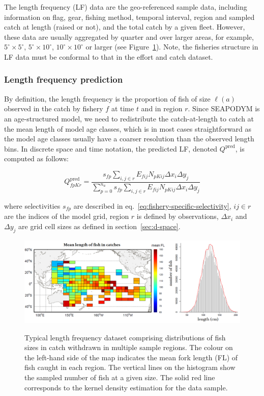 The length frequency (LF) data are the geo-referenced sample data, including information on flag, gear, fishing method, temporal interval, region and sampled catch at length (raised or not), and the total catch by a given fleet. However, these data are usually aggregated by quarter and over larger areas, for example, $5^{\circ} \times 5^{\circ}$, $5^{\circ} \times 10^{\circ}$, $10^{\circ} \times 10^{\circ}$ or larger (see Figure~\ref{fig:lf-data}). Note, the fisheries structure in LF data must be conformal to that in the effort and catch dataset. 

\subsubsection{Length frequency prediction}

By definition, the length frequency is the proportion of fish of size $\ell(a)$ observed in the catch by fishery $f$ at time $t$ and in region $r$. Since SEAPODYM is an age-structured model, we need to redistribute the catch-at-length to catch at the mean length of model age classes, which is in most cases straightforward as the model age classes usually have a coarser resolution than the observed length bins. In discrete space and time notation, the predicted LF, denoted $Q^{\text{pred}}$, is computed as follows:

\begin{equation}
 Q^{\text{pred}}_{fpKr}=\frac{s_{fp} \sum\limits_{i,j \in r} E_{fij} N_{pKij}{\scriptstyle\Delta x_i} {\scriptstyle\Delta y_j}}{\sum\limits^{n_a}_{p=0} s_{fp} \sum\limits_{i,j \in r} E_{fij} N_{pKij}{\scriptstyle\Delta x_i} {\scriptstyle\Delta} y_j}
\label{eq:LF}
\end{equation}

\noindent where selectivities $s_{fp}$ are described in eq.~\eqref{eq:fishery-specific-selectivity}, $ij \in r$ are the indices of the model grid, region $r$ is defined by observations, $\Delta x_i$ and $\Delta y_j$ are grid cell sizes as defined in section~\ref{sec:d-space}. 

\begin{figure}[htbp]
  \centering
  \includegraphics[width=1.0\textwidth]{chapter4/figs/LF-data}\\
  \caption{Typical length frequency dataset comprising distributions of fish sizes in catch withdrawn in multiple sample regions. The colour on the left-hand side of the map indicates the mean fork length (FL) of fish caught in each region. The vertical lines on the histogram show the sampled number of fish at a given size. The solid red line corresponds to the kernel density estimation for the data sample.}
  \label{fig:lf-data}
\end{figure}

